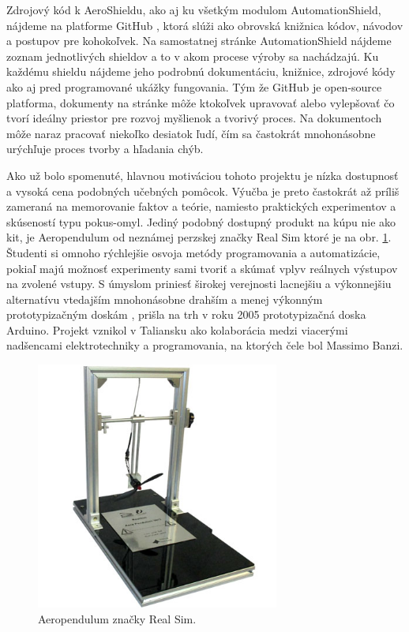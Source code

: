 Zdrojový kód k AeroShieldu, ako aj ku všetkým modulom AutomationShield, nájdeme na platforme GitHub \cite{Git}, ktorá slúži ako obrovská knižnica kódov, návodov a postupov pre kohokoľvek. Na samostatnej stránke AutomationShield nájdeme zoznam jednotlivých shieldov a to v akom procese výroby sa nachádzajú. Ku každému shieldu nájdeme jeho podrobnú dokumentáciu, knižnice, zdrojové kódy ako aj pred programované ukážky fungovania. Tým že GitHub je open-source platforma, dokumenty na stránke môže ktokoľvek upravovať alebo vylepšovať čo tvorí ideálny priestor pre rozvoj myšlienok a tvorivý proces. Na dokumentoch môže naraz pracovať niekoľko desiatok ľudí, čím sa častokrát mnohonásobne urýchľuje proces tvorby a hľadania chýb.

Ako už bolo spomenuté, hlavnou motiváciou tohoto projektu je nízka dostupnosť a vysoká cena podobných učebných pomôcok. Výučba je preto častokrát až príliš zameraná na memorovanie faktov a teórie, namiesto praktických experimentov a skúseností typu pokus-omyl. Jediný podobný dostupný produkt na kúpu nie ako kit, je Aeropendulum od neznámej perzskej značky Real Sim ktoré je na obr. \ref{OBRAZOK 1.2}. Študenti si omnoho rýchlejšie osvoja metódy programovania a automatizácie, pokiaľ majú možnosť experimenty sami tvoriť a skúmať vplyv reálnych výstupov na zvolené vstupy. S úmyslom priniesť širokej verejnosti lacnejšiu a výkonnejšiu alternatívu vtedajším mnohonásobne drahším a menej výkonným prototypizačným doskám \cite{stamp}, prišla na trh v roku 2005 prototypizačná doska Arduino. Projekt vznikol v Taliansku ako kolaborácia medzi viacerými nadšencami elektrotechniky a programovania, na ktorých čele bol Massimo Banzi.

\begin{figure}[!tbh]
	\centering
	\includegraphics[width=80mm]{obr/pendulum.jpg}
	\caption{{Aeropendulum značky Real Sim\cite{AeroPendulumTeheran}.}}\label{OBRAZOK 1.2}
\end{figure}

